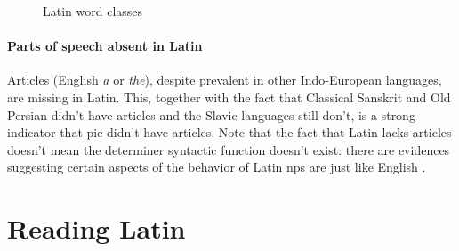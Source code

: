 \documentclass[a4paper, oneside, 12pt]{report}
\newcommand{\form}[1]{\emph{#1}}
\begin{document}
\begin{sidewaysfigure}
    \centering
    \small
    
    \caption{Latin word classes}
    \label{fig:latin-word-class}
\end{sidewaysfigure}

\paragraph*{Parts of speech absent in Latin} 
Articles (English \form{a} or \form{the}), 
despite prevalent in other Indo-European languages,
are missing in Latin.
This, together with the fact that Classical Sanskrit and Old Persian didn't have articles 
and the Slavic languages still don't,
is a strong indicator that \ac{pie} didn't have articles. 
Note that the fact that Latin lacks articles 
doesn't mean the determiner syntactic function doesn't exist:
there are evidences suggesting certain aspects of the behavior of Latin \acs{np}s 
are just like English \citep{giusti2014split}.

\section{Reading Latin}\label{sec:grammatical.parse}
\end{document}
